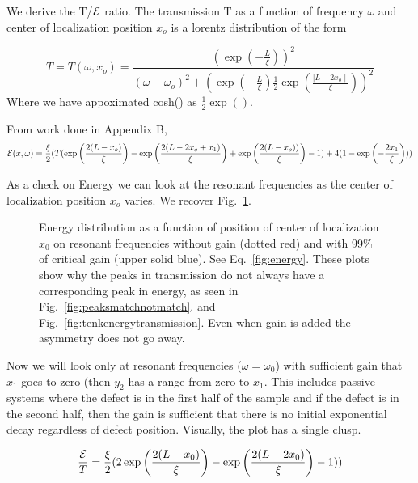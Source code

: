 We derive the T/${\cal E}$ ratio. The transmission T as a 
function of frequency $\omega$ and center of localization position $x_o$ 
is a lorentz distribution of the form

\begin{equation}
T = T(\omega, x_o) = \frac{(\exp(-\frac{L}{\xi}))^2}{ 
(\omega-\omega _o)^2 + (\exp(-\frac{L}{\xi})\frac{1}{2}\exp(\frac{\mid L-2 x_o \mid}{\xi}))^2 }
\label{eq:transmission}
\end{equation}
Where we have appoximated cosh() as $\frac{1}{2}\exp()$. 


From work done in Appendix B,
\begin{equation}
{\cal E}(x,\omega) = \frac{\xi}{2} ( T ( \exp\left(\frac{2(L-x_o)}{\xi}\right) - \exp\left(\frac{2(L-2 x_o+x_1)}{\xi}\right) + \exp\left(\frac{2(L-x_o))}{\xi}\right) -1 ) + 4 (1-\exp\left(-\frac{2 x_1}{\xi}\right)) )
\label{fig:energy}
\end{equation}

As a check on Energy we can look at the resonant frequencies as the center of localization position $x_o$ varies. We recover Fig.~\ref{fig:energydistrib}.

\begin{figure}
\vskip -0.5cm
\centerline{
}
\vskip -0.5cm
\caption{Energy distribution as a function of position of center
of localization $x_0$ on resonant frequencies without gain (dotted
red) and with 99\% of critical gain (upper solid blue). See 
Eq.~\ref{fig:energy}. These
plots show why the peaks in transmission do not always have a corresponding
peak in energy, as seen in Fig.~\ref{fig:peaksmatchnotmatch}. and 
Fig.~\ref{fig:tenkenergytransmission}. Even when gain is added the 
asymmetry does not go away.}
\label{fig:energydistrib}
\end{figure}

Now we will look only at resonant frequencies
($\omega = \omega_0$) with sufficient gain that $x_1$ goes to zero (then
$y_2$ has a range from zero to $x_1$. This includes passive systems where the defect is in
the first half of the sample and if the defect is in
the second half, then the gain is sufficient that there 
is no initial exponential decay regardless of defect position. Visually, the plot has a single clusp.  

\begin{equation}
\frac{\cal E}{T} = \frac{\xi}{2} ( 2 \exp\left(\frac{2(L-x_0)}{\xi}\right) - \exp\left(\frac{2(L-2 x_0)}{\xi}\right) -1 ) )
\end{equation}

